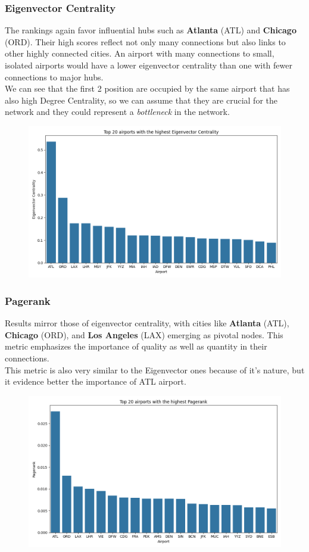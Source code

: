 \documentclass[12pt]{article}
\begin{document}
    \subsubsection{Eigenvector Centrality}
    The rankings again favor influential hubs such as \textbf{Atlanta} (ATL) and \textbf{Chicago} (ORD). Their high scores reflect not only many connections but also links to other highly connected cities. An airport with many connections to small, isolated airports would have a lower eigenvector centrality than one with fewer connections to major hubs.\\
    We can see that the first 2 position are occupied by the same airport that has also high Degree Centrality, so we can assume that they are crucial for the network and they could represent a \textit{bottleneck} in the network.\\    

    \begin{figure}[H]
        \centering
        \includegraphics[width=0.8\linewidth]{img/eigenvector_centrality}
    \end{figure}

    \subsubsection{Pagerank}
    Results mirror those of eigenvector centrality, with cities like \textbf{Atlanta} (ATL), \textbf{Chicago} (ORD), and \textbf{Los Angeles} (LAX) emerging as pivotal nodes. This metric emphasizes the importance of quality as well as quantity in their connections.\\
    This metric is also very similar to the Eigenvector ones because of it's nature, but it evidence better the importance of ATL airport.
    
    \begin{figure}[H]
        \centering
        \includegraphics[width=0.8\linewidth]{img/pagerank}
    \end{figure}
\end{document}
